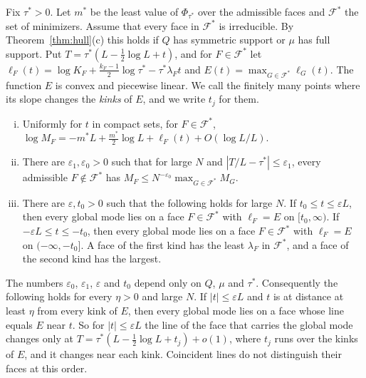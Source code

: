 \begin{theorem}\label{thm:window}
Fix $\tau^*>0$. Let $m^*$ be the least value of $\Phi_{\tau^*}$ over the
admissible faces and $\mathcal F^*$ the set of minimizers. Assume that every
face in $\mathcal F^*$ is irreducible. By Theorem~\ref{thm:hull}(c) this holds
if $Q$ has symmetric support or $\mu$ has full support. Put $T=\tau^*(L-\frac12\log L+t)$, and for
$F\in\mathcal F^*$ let
$\ell_F(t)=\log K_F+\frac{k_F-1}2\log\tau^*-\tau^*\lambda_Ft$ and
$E(t)=\max_{G\in\mathcal F^*}\ell_G(t)$. The function $E$ is convex and piecewise linear. We call
the finitely many points where its slope changes the \emph{kinks} of $E$, and we write $t_j$ for
them.
\begin{enumerate}[(i)]
\item Uniformly for $t$ in compact sets, for $F\in\mathcal F^*$,
$\log M_F=-m^*L+\frac{m^*}2\log L+\ell_F(t)+O(\log L/L)$.
\item There are $\varepsilon_1,\varepsilon_0>0$ such that for large $N$ and
$|T/L-\tau^*|\le\varepsilon_1$, every admissible $F\notin\mathcal F^*$ has
$M_F\le N^{-\varepsilon_0}\max_{G\in\mathcal F^*}M_G$.
\item There are $\varepsilon,t_0>0$ such that the following holds for large $N$. If
$t_0\le t\le\varepsilon L$, then every global mode lies on a face $F\in\mathcal F^*$ with
$\ell_F=E$ on $[t_0,\infty)$. If $-\varepsilon L\le t\le-t_0$, then every global mode lies on a
face $F\in\mathcal F^*$ with $\ell_F=E$ on $(-\infty,-t_0]$. A face of the first kind has the
least $\lambda_F$ in $\mathcal F^*$, and a face of the second kind has the largest.
\end{enumerate}
The numbers $\varepsilon_0$, $\varepsilon_1$, $\varepsilon$ and $t_0$ depend only on $Q$,
$\mu$ and $\tau^*$.
Consequently the following holds for every $\eta>0$ and large $N$. If $|t|\le\varepsilon L$ and
$t$ is at distance at least $\eta$ from every kink of $E$, then every global mode lies on a face
whose line equals $E$ near $t$. So for $|t|\le\varepsilon L$ the line of the face that carries
the global mode changes only at $T=\tau^*(L-\frac12\log L+t_j)+o(1)$, where $t_j$ runs over the
kinks of $E$, and it changes near each kink. Coincident lines do not distinguish
their faces at this order.
\end{theorem}

